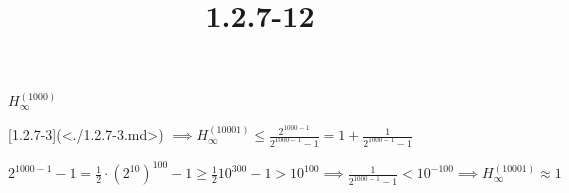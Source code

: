 \documentclass{article}
\title{1.2.7-12}
\begin{document}
\maketitle

$H_{\infty}^{(1000)}$

[1.2.7-3](<./1.2.7-3.md>) $\implies H_{\infty}^{(10001)} \leq \frac{2^{1000-1}}{2^{1000-1}-1} = 1 + \frac{1}{2^{1000-1}-1}$

$2^{1000-1}-1 = \frac{1}{2} \cdot (2^{10})^{100} - 1 \geq \frac{1}{2} 10^{300} - 1 > 10^{100} \implies \frac{1}{2^{1000-1}-1} < 10^{-100} \implies H_{\infty}^{(10001)} \approx 1$
\end{document}

